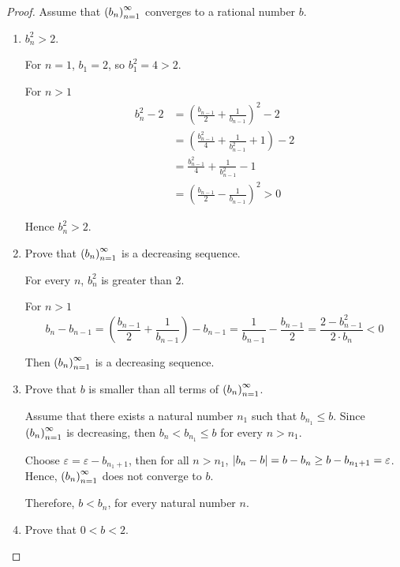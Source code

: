 \begin{proof}
    Assume that ${\left({b_{n}}\right)}^{\infty}_{n=1}$ converges to a rational number $b$.
    \begin{enumerate}[label={\textbf{Step \arabic*.}},itemindent=1cm]
        \item ${b^{2}_{n}} > 2$.

              For $n = 1$, $b_{1} = 2$, so $b^{2}_{1} = 4 > 2$.

              For $n > 1$
              \begin{align*}
                  {b^{2}_{n}} - 2 & = {\left(\frac{b_{n-1}}{2} + \frac{1}{b_{n-1}}\right)}^{2} - 2         \\
                                  & = {\left(\frac{b^{2}_{n-1}}{4} + \frac{1}{b^{2}_{n-1}} + 1\right)} - 2 \\
                                  & = \frac{b^{2}_{n-1}}{4} + \frac{1}{b^{2}_{n-1}} - 1                    \\
                                  & = {\left(\frac{b_{n-1}}{2} - \frac{1}{b_{n-1}}\right)}^{2} > 0
              \end{align*}

              Hence $b^{2}_{n} > 2$.
        \item Prove that ${\left({b_{n}}\right)}^{\infty}_{n=1}$ is a decreasing sequence.

              For every $n$, ${b^{2}_{n}}$ is greater than $2$.

              For $n > 1$
              \[
                  b_{n} - b_{n-1} = \left(\frac{b_{n-1}}{2} + \frac{1}{b_{n-1}}\right) - b_{n-1} = \frac{1}{b_{n-1}} - \frac{b_{n-1}}{2} = \frac{2 - {b}^{2}_{n-1}}{2\cdot b_{n}} < 0
              \]

              Then ${\left({b_{n}}\right)}^{\infty}_{n=1}$ is a decreasing sequence.
        \item Prove that $b$ is smaller than all terms of ${\left({b_{n}}\right)}^{\infty}_{n=1}$.

              Assume that there exists a natural number $n_{1}$ such that $b_{n_{1}}\le b$. Since ${\left({b_{n}}\right)}^{\infty}_{n=1}$ is decreasing, then $b_{n} < b_{n_{1}}\le b$ for every $n > n_{1}$.

              Choose $\varepsilon = \varepsilon - b_{n_{1} + 1}$, then for all $n > n_{1}$, $\left\vert{b_{n} - b}\right\vert = b - b_{n} \ge b - b_{n_{1} + 1} = \varepsilon$. Hence, ${\left({b_{n}}\right)}^{\infty}_{n=1}$ does not converge to $b$.

              Therefore, $b < b_{n}$, for every natural number $n$.
        \item Prove that $0 < b < 2$.


\end{enumerate}
\end{proof}
